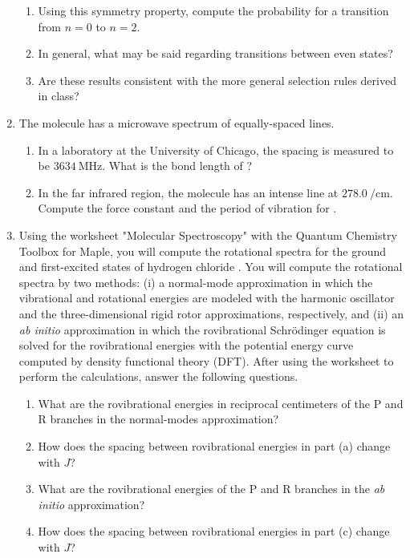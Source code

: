 \documentclass[../psets.tex]{subfiles}
\begin{document}
\begin{enumerate}
\begin{enumerate}
        \item Using this symmetry property, compute the probability for a transition from $n=0$ to $n=2$.
        \item In general, what may be said regarding transitions between even states?
        \item Are these results consistent with the more general selection rules derived in class?
    \end{enumerate}
    \item The molecule  has a microwave spectrum of equally-spaced lines.
    \begin{enumerate}
        \item In a laboratory at the University of Chicago, the spacing is measured to be $\SI{3634}{\mega\hertz}$. What is the bond length of ?
        \item In the far infrared region, the molecule  has an intense line at $\SI{278.0}{\per\centi\meter}$. Compute the force constant and the period of vibration for .
    \end{enumerate}
    \item Using the worksheet "Molecular Spectroscopy" with the Quantum Chemistry Toolbox for Maple, you will compute the rotational spectra for the ground and first-excited states of hydrogen chloride . You will compute the rotational spectra by two methods: (i) a normal-mode approximation in which the vibrational and rotational energies are modeled with the harmonic oscillator and the three-dimensional rigid rotor approximations, respectively, and (ii) an \emph{ab initio} approximation in which the rovibrational Schr\"{o}dinger equation is solved for the rovibrational energies with the potential energy curve computed by density functional theory (DFT). After using the worksheet to perform the calculations, answer the following questions.
    \begin{enumerate}
        \item What are the rovibrational energies in reciprocal centimeters of the P and R branches in the normal-modes approximation?
        \item How does the spacing between rovibrational energies in part (a) change with $J$?
        \item What are the rovibrational energies of the P and R branches in the \emph{ab initio} approximation?
        \item How does the spacing between rovibrational energies in part (c) change with $J$?

\end{enumerate}
\end{enumerate}
\end{document}
